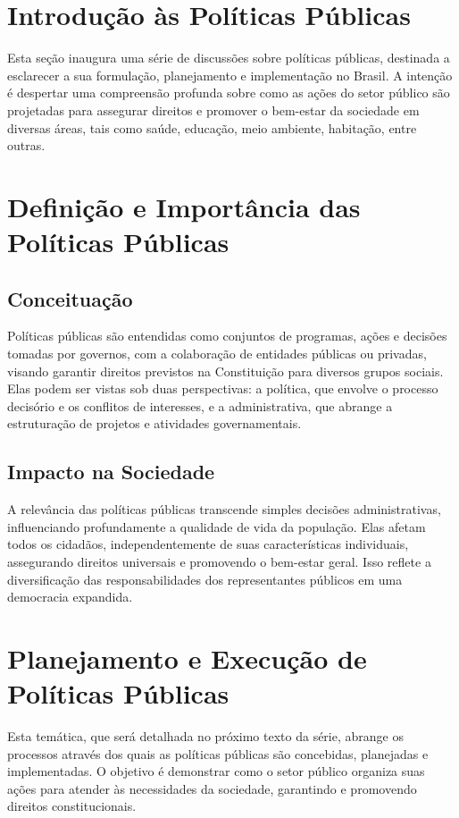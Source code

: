\documentclass[
   article,       
   12pt,          
   oneside,       
   a4paper,       
   english,       
   brazil,        
   sumario=tradicional
   ]{abntex2}
\begin{document}
\section{Introdução às Políticas Públicas}
    Esta seção inaugura uma série de discussões sobre políticas públicas, destinada a esclarecer a sua formulação, planejamento e implementação no Brasil. A intenção é despertar uma compreensão profunda sobre como as ações do setor público são projetadas para assegurar direitos e promover o bem-estar da sociedade em diversas áreas, tais como saúde, educação, meio ambiente, habitação, entre outras.

\section{Definição e Importância das Políticas Públicas}
    \subsection{Conceituação}
        Políticas públicas são entendidas como conjuntos de programas, ações e decisões tomadas por governos, com a colaboração de entidades públicas ou privadas, visando garantir direitos previstos na Constituição para diversos grupos sociais. Elas podem ser vistas sob duas perspectivas: a política, que envolve o processo decisório e os conflitos de interesses, e a administrativa, que abrange a estruturação de projetos e atividades governamentais.
    
    \subsection{Impacto na Sociedade}
        A relevância das políticas públicas transcende simples decisões administrativas, influenciando profundamente a qualidade de vida da população. Elas afetam todos os cidadãos, independentemente de suas características individuais, assegurando direitos universais e promovendo o bem-estar geral. Isso reflete a diversificação das responsabilidades dos representantes públicos em uma democracia expandida.

\section{Planejamento e Execução de Políticas Públicas}
    Esta temática, que será detalhada no próximo texto da série, abrange os processos através dos quais as políticas públicas são concebidas, planejadas e implementadas. O objetivo é demonstrar como o setor público organiza suas ações para atender às necessidades da sociedade, garantindo e promovendo direitos constitucionais.
\end{document}
